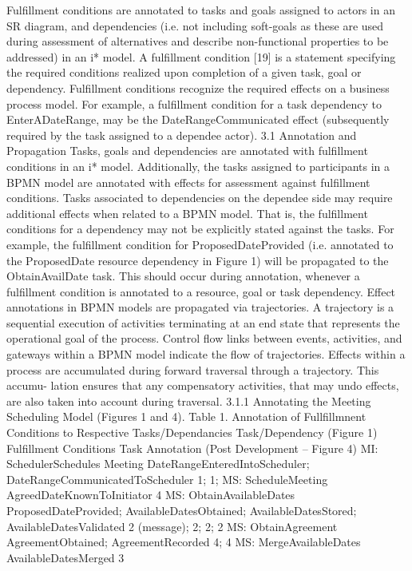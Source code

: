 Fulfillment conditions are annotated to tasks and goals assigned to actors in an SR
diagram, and dependencies (i.e. not including soft-goals as these are used during
assessment of alternatives and describe non-functional properties to be addressed) in
an i* model. A fulfillment condition [19] is a statement specifying the required conditions realized upon completion of a given task, goal or dependency. Fulfillment conditions recognize the required effects on a business process model. For example, a
fulfillment condition for a task dependency to EnterADateRange, may be the DateRangeCommunicated effect (subsequently required by the task assigned to a dependee
actor).
3.1 Annotation and Propagation
Tasks, goals and dependencies are annotated with fulfillment conditions in an i*
model. Additionally, the tasks assigned to participants in a BPMN model are annotated with effects for assessment against fulfillment conditions.
Tasks associated to dependencies on the dependee side may require additional effects when related to a BPMN model. That is, the fulfillment conditions for a dependency may not be explicitly stated against the tasks. For example, the fulfillment
condition for ProposedDateProvided (i.e. annotated to the ProposedDate resource
dependency in Figure 1) will be propagated to the ObtainAvailDate task. This should
occur during annotation, whenever a fulfillment condition is annotated to a resource,
goal or task dependency.
Effect annotations in BPMN models are propagated via trajectories. A trajectory
is a sequential execution of activities terminating at an end state that represents the
operational goal of the process. Control flow links between events, activities, and
gateways within a BPMN model indicate the flow of trajectories. Effects within a
process are accumulated during forward traversal through a trajectory. This accumu-
lation ensures that any compensatory activities, that may undo effects, are also taken
into account during traversal.
3.1.1 Annotating the Meeting Scheduling Model (Figures 1 and 4).
Table 1. Annotation of Fullfillmnent Conditions to Respective Tasks/Dependancies
Task/Dependency (Figure 1) Fulfillment Conditions Task Annotation (Post
Development – Figure 4)
MI: SchedulerSchedules Meeting DateRangeEnteredIntoScheduler;
DateRangeCommunicatedToScheduler
1;
1;
MS: ScheduleMeeting AgreedDateKnownToInitiator 4
MS: ObtainAvailableDates ProposedDateProvided;
AvailableDatesObtained;
AvailableDatesStored;
AvailableDatesValidated
2 (message);
2;
2;
2
MS: ObtainAgreement AgreementObtained;
AgreementRecorded
4;
4
MS: MergeAvailableDates AvailableDatesMerged 3
